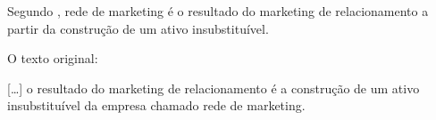 \documentclass[
	12pt,				%
	oneside,			%
	a4paper,			%
	english,			%
	french,				%
	spanish,			%
	brazil				%
	]{abntex2}
\renewenvironment{quote}
  {\small\list{}{\rightmargin=0.1cm \leftmargin=4cm}%
   \item\relax}
  {\endlist}
\begin{document}
Segundo , rede de marketing é o resultado do
marketing de relacionamento a partir da construção de um ativo
insubstituível.

O texto original:

\begin{quote}
{[}\ldots{}{]} o resultado do marketing de relacionamento é a construção
de um ativo insubstituível da empresa chamado rede de marketing.
\end{quote}

\postextual

\postextual



\end{document}
